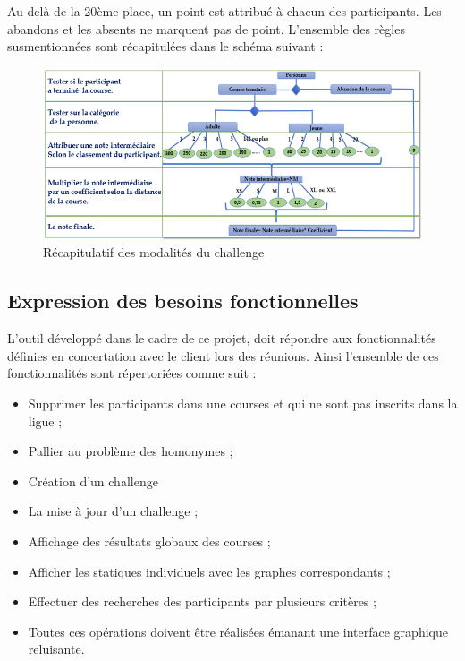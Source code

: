 	\newpage
	Au-delà de la 20ème place, un point est attribué à chacun des participants. Les abandons et les absents ne marquent pas de point. 
	L’ensemble des règles susmentionnées sont récapitulées dans le schéma suivant :
	\begin{figure}[!h]
	   \center
	   \includegraphics[scale=0.9]{img/recapitulatif_modalite_challenge.png}
	   \caption {Récapitulatif des modalités du challenge}
	\end{figure}
	
	\newpage
	\subsection{Expression des besoins fonctionnelles}
	L’outil développé dans le cadre de ce projet, doit répondre aux fonctionnalités définies en concertation avec le client lors des réunions. Ainsi l’ensemble de ces fonctionnalités sont répertoriées comme suit :
	\begin{itemize} 
	\item Supprimer les participants dans une courses et qui ne sont pas inscrits dans la ligue ;	
	\item Pallier au problème des homonymes ;
	\item Création d’un challenge
	\item La mise à jour d’un challenge ;
	\item Affichage des résultats globaux des courses ;
	\item Afficher les statiques individuels avec les graphes correspondants ;
	\item Effectuer des recherches des participants par plusieurs critères ;
	\item Toutes ces opérations doivent être réalisées émanant une interface graphique reluisante.
	\end{itemize} 
	
